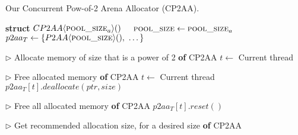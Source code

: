 \begin{algorithm}[hbtp]
\caption{Our Concurrent Pow-of-2 Arena Allocator (CP2AA).}
\label{alg:cp2aa}
\begin{algorithmic}[1]

\Statex

\State \textbf{struct} $CP2AA \langle \textsc{pool\_size}_a \rangle ()$
\State \ \ $\textsc{pool\_size} \gets \textsc{pool\_size}_a$  \label{alg:cp2aa--init-const}
\State \ \ $p2aa_T \gets \{P2AA \langle \textsc{pool\_size} \rangle (),\ \dots\}$  \label{alg:cp2aa--init}

\Statex

\State $\rhd$ Allocate memory of size that is a power of 2
 \textbf{of} CP2AA
  \State $t \gets$ Current thread \label{alg:cp2aa--allocate-begin}
   \label{alg:cp2aa--allocate-end}
\EndFunction

\Statex

\State $\rhd$ Free allocated memory
 \textbf{of} CP2AA
  \State $t \gets$ Current thread \label{alg:cp2aa--deallocate-begin}
  \State $p2aa_T[t].deallocate(ptr, size)$ \label{alg:cp2aa--deallocate-end}
\EndFunction

\Statex

\State $\rhd$ Free all allocated memory
 \textbf{of} CP2AA
   \label{alg:cp2aa--reset-begin}
    \State $p2aa_T[t].reset()$
  \EndFor \label{alg:cp2aa--reset-end}
\EndFunction

\Statex

\State $\rhd$ Get recommended allocation size, for a desired size
 \textbf{of} CP2AA
   \label{alg:cp2aa--allocationsize}
\EndFunction
\end{algorithmic}
\end{algorithm}

